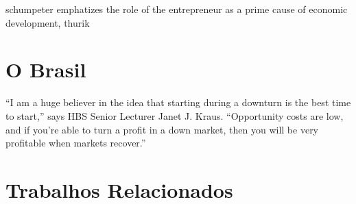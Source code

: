 schumpeter emphatizes the role of the entrepreneur as a prime cause of economic development,  thurik

\section{O Brasil}

“I am a huge believer in the idea that starting during a downturn is the best time to start,” says HBS Senior Lecturer Janet J. Kraus. “Opportunity costs are low, and if you’re able to turn a profit in a down market, then you will be very profitable when markets recover.”



\section{Trabalhos Relacionados}
\label{section:trabalhos_relacionados}

